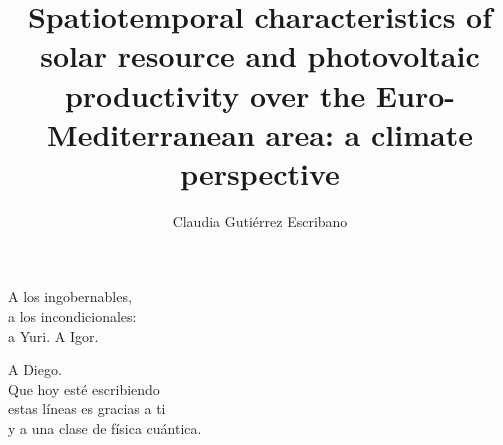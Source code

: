 \documentclass[oldfontcommands, a4paper, 12pt]{memoir}%
\begin{document}

   
\pagestyle{empty}
\begin{titlingpage}


  
\title{Spatiotemporal characteristics of solar resource and photovoltaic productivity over the Euro-Mediterranean area: a climate perspective}%

\author{Claudia Gutiérrez Escribano}
\date{}

\titleUL
\newpage
\thispagestyle{empty}
\mbox{}
\maketitle

\end{titlingpage}

\frontmatter

\begin{flushright}
\null{}
A los ingobernables,\\ a los incondicionales:\\ a Yuri. A Igor.
\null
\end{flushright}

\cleardoublepage

\begin{flushright}
\null{}
A Diego.\\ Que hoy esté escribiendo\\ estas líneas es gracias a ti\\ y a una clase de física cuántica.
\null
\end{flushright}


% 




\clearpage



\clearpage

\cleardoublepage

% 
\tableofcontents
 
\printnomenclature


\mainmatter











\appendix

\backmatter

\printbibliography

\clearpage
\listoffigures
\clearpage
\listoftables
\end{document}
